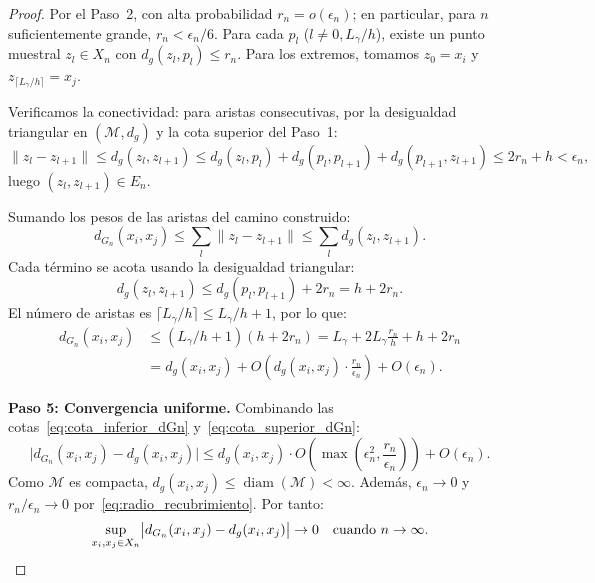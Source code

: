 \begin{proof}
	Por el Paso~2, con alta probabilidad $r_n = o(\epsilon_n)$; en particular, para $n$ suficientemente grande, $r_n < \epsilon_n/6$. Para cada $p_l$ ($l \neq 0, L_\gamma/h$), existe un punto muestral $z_l \in X_n$ con $d_g(z_l, p_l) \leq r_n$. Para los extremos, tomamos $z_0 = x_i$ y $z_{\lceil L_\gamma/h \rceil} = x_j$.

	Verificamos la conectividad: para aristas consecutivas, por la desigualdad triangular en $(\mathcal{M}, d_g)$ y la cota superior del Paso~1:
	\[
	\|z_l - z_{l+1}\| \leq d_g(z_l, z_{l+1}) \leq d_g(z_l, p_l) + d_g(p_l, p_{l+1}) + d_g(p_{l+1}, z_{l+1}) \leq 2r_n + h < \epsilon_n,
	\]
	luego $(z_l, z_{l+1}) \in E_n$.

	Sumando los pesos de las aristas del camino construido:
	\[
	d_{G_n}(x_i, x_j) \leq \sum_l \|z_l - z_{l+1}\| \leq \sum_l d_g(z_l, z_{l+1}).
	\]
	Cada término se acota usando la desigualdad triangular:
	\[
	d_g(z_l, z_{l+1}) \leq d_g(p_l, p_{l+1}) + 2r_n = h + 2r_n.
	\]
	El número de aristas es $\lceil L_\gamma / h \rceil \leq L_\gamma/h + 1$, por lo que:
	\begin{equation}\label{eq:cota_superior_dGn}
	\begin{split}
	d_{G_n}(x_i, x_j) &\leq (L_\gamma/h + 1)(h + 2r_n) = L_\gamma + 2L_\gamma \frac{r_n}{h} + h + 2r_n \\
	&= d_g(x_i,x_j) + O\!\left(d_g(x_i,x_j) \cdot \frac{r_n}{\epsilon_n}\right) + O(\epsilon_n).
	\end{split}
	\end{equation}

	\textbf{Paso 5: Convergencia uniforme.}
	Combinando las cotas~\eqref{eq:cota_inferior_dGn} y~\eqref{eq:cota_superior_dGn}:
	\[
	\bigl|d_{G_n}(x_i, x_j) - d_g(x_i, x_j)\bigr| \leq d_g(x_i, x_j) \cdot O\!\left(\max\!\left(\epsilon_n^2, \frac{r_n}{\epsilon_n}\right)\right) + O(\epsilon_n).
	\]
	Como $\mathcal{M}$ es compacta, $d_g(x_i, x_j) \leq \operatorname{diam}(\mathcal{M}) < \infty$. Además, $\epsilon_n \to 0$ y $r_n/\epsilon_n \to 0$ por~\eqref{eq:radio_recubrimiento}. Por tanto:
	\[
	\sup_{x_i, x_j \in X_n} \bigl|d_{G_n}(x_i, x_j) - d_g(x_i, x_j)\bigr| \to 0 \quad \text{cuando } n \to \infty. \qedhere
	\]
\end{proof}

